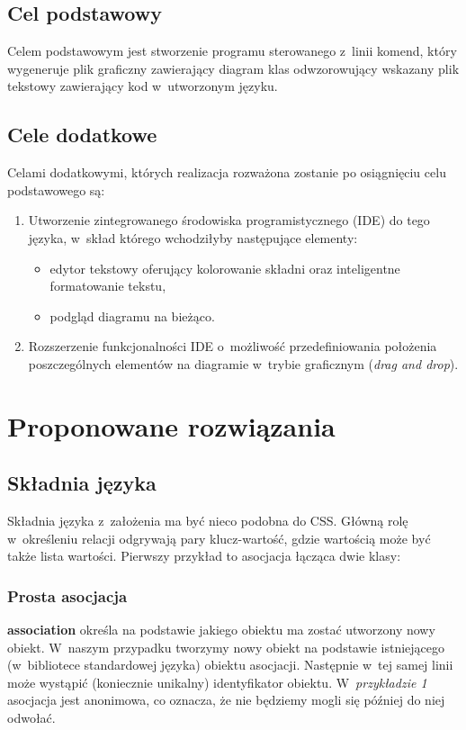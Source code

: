 \documentclass[a4paper, 11pt]{report}
\begin{document}
\subsection{Cel podstawowy}
Celem podstawowym jest stworzenie programu sterowanego z~linii komend, który wygeneruje plik
graficzny zawierający diagram klas odwzorowujący wskazany plik tekstowy zawierający kod w~utworzonym
języku.

\subsection{Cele dodatkowe}
Celami dodatkowymi, których realizacja rozważona zostanie po osiągnięciu celu podstawowego są:
\begin{enumerate}
  \item{
    Utworzenie zintegrowanego środowiska programistycznego (IDE) do tego języka, w~skład którego
    wchodziłyby następujące elementy:
    \begin{itemize}
      \item{edytor tekstowy oferujący kolorowanie składni oraz inteligentne formatowanie tekstu,}
      \item{podgląd diagramu na bieżąco.}
    \end{itemize}
  }
  \item{Rozszerzenie funkcjonalności IDE o~możliwość przedefiniowania położenia poszczególnych
    elementów na diagramie w~trybie graficznym (\emph{drag and drop}).}
\end{enumerate}
\section{Proponowane rozwiązania}
\subsection{Składnia języka}
Składnia języka z~założenia ma być nieco podobna do CSS. Główną rolę w~określeniu relacji
odgrywają pary klucz-wartość, gdzie wartością może być także lista wartości. Pierwszy przykład to
asocjacja łącząca dwie klasy:

\subsubsection{Prosta asocjacja}


\textbf{association} określa na podstawie jakiego obiektu ma zostać utworzony nowy obiekt. W~naszym
przypadku tworzymy nowy obiekt na podstawie istniejącego (w~bibliotece standardowej języka) obiektu
asocjacji. Następnie w~tej samej linii może wystąpić (koniecznie unikalny) identyfikator obiektu.
W~\emph{przykładzie 1} asocjacja jest anonimowa, co oznacza, że nie będziemy mogli się później do
niej odwołać.
\end{document}
